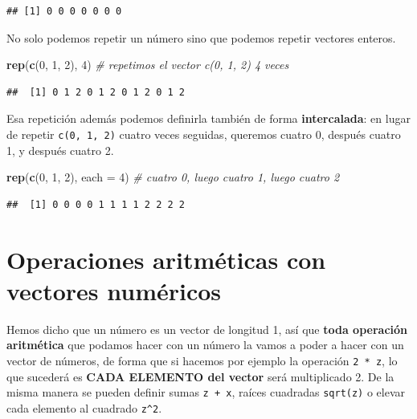 \documentclass[11pt,]{book}
\newenvironment{Shaded}{\begin{snugshade}}{\end{snugshade}}
\newcommand{\CommentTok}[1]{\textcolor[rgb]{0.37,0.37,0.37}{\textit{#1}}}
\newcommand{\DataTypeTok}[1]{\textcolor[rgb]{0.27,0.27,0.27}{#1}}
\newcommand{\DecValTok}[1]{\textcolor[rgb]{0.06,0.06,0.06}{#1}}
\newcommand{\KeywordTok}[1]{\textcolor[rgb]{0.27,0.27,0.27}{\textbf{#1}}}
\newcommand{\NormalTok}[1]{#1}
\begin{document}
\begin{verbatim}
## [1] 0 0 0 0 0 0 0
\end{verbatim}

No solo podemos repetir un número sino que podemos repetir vectores enteros.

\begin{Shaded}
\begin{Highlighting}[]
\KeywordTok{rep}\NormalTok{(}\KeywordTok{c}\NormalTok{(}\DecValTok{0}\NormalTok{, }\DecValTok{1}\NormalTok{, }\DecValTok{2}\NormalTok{), }\DecValTok{4}\NormalTok{) }\CommentTok{# repetimos el vector c(0, 1, 2) 4 veces}
\end{Highlighting}
\end{Shaded}

\begin{verbatim}
##  [1] 0 1 2 0 1 2 0 1 2 0 1 2
\end{verbatim}

Esa repetición además podemos definirla también de forma \textbf{intercalada}: en lugar de repetir \texttt{c(0,\ 1,\ 2)} cuatro veces seguidas, queremos cuatro 0, después cuatro 1, y después cuatro 2.

\begin{Shaded}
\begin{Highlighting}[]
\KeywordTok{rep}\NormalTok{(}\KeywordTok{c}\NormalTok{(}\DecValTok{0}\NormalTok{, }\DecValTok{1}\NormalTok{, }\DecValTok{2}\NormalTok{), }\DataTypeTok{each =} \DecValTok{4}\NormalTok{) }\CommentTok{# cuatro 0, luego cuatro 1, luego cuatro 2}
\end{Highlighting}
\end{Shaded}

\begin{verbatim}
##  [1] 0 0 0 0 1 1 1 1 2 2 2 2
\end{verbatim}

\hypertarget{operaciones-aritmuxe9ticas-con-vectores-numuxe9ricos}{%
\section{Operaciones aritméticas con vectores numéricos}\label{operaciones-aritmuxe9ticas-con-vectores-numuxe9ricos}}

Hemos dicho que un número es un vector de longitud 1, así que \textbf{toda operación aritmética} que podamos hacer con un número la vamos a poder a hacer con un vector de números, de forma que si hacemos por ejemplo la operación \texttt{2\ *\ z}, lo que sucederá es \textbf{CADA ELEMENTO del vector} será multiplicado 2. De la misma manera se pueden definir sumas \texttt{z\ +\ x}, raíces cuadradas \texttt{sqrt(z)} o elevar cada elemento al cuadrado \texttt{z\^{}2}.
\end{document}

